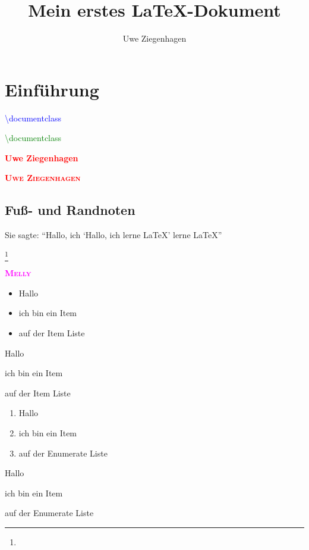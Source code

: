 \documentclass[ngerman,12pt,parskip=half]{scrreprt}
\author{Uwe Ziegenhagen}
\title{Mein erstes \LaTeX-Dokument}
\newcommand{\person}[1]{\textcolor{red}{\textsc{\textbf{#1}}}}
\newcommand{\tier}[1]{\textcolor{magenta}{\textsc{\textbf{#1}}}}
\newcommand{\latexbefehl}[1]{\textcolor{blue}{\ttfamily\textbackslash #1}}
\newcommand{\zweiparams}[2]{\textcolor{#1}{\ttfamily\textbackslash #2}}
\begin{document}
 
\maketitle

\tableofcontents

\chapter{Einführung}

\latexbefehl{documentclass}

\zweiparams{green}{documentclass}


\textcolor{red}{\textbf{Uwe Ziegenhagen}}

\person{Uwe Ziegenhagen}

\section{Fuß- und Randnoten}

\blindtext{}

Sie sagte: \enquote{Hallo, ich \enquote{Hallo, ich lerne LaTeX} lerne LaTeX}

\blindtext\footnote{\blindtext[2]}


\tier{Melly}

\begin{itemize}[\(\Rightarrow\)]
\item Hallo
\item ich bin ein Item
\item auf der Item Liste
\end{itemize}

\begin{compactitem}[\(\Rightarrow\)]
\item Hallo
\item ich bin ein Item
\item auf der Item Liste
\end{compactitem}


\begin{enumerate}[i]
\item Hallo
\item ich bin ein Item
\item auf der Enumerate Liste
\end{enumerate}

\begin{compactenum}[i]
\item Hallo
\item ich bin ein Item
\item auf der Enumerate Liste
\end{compactenum}
\end{document}

